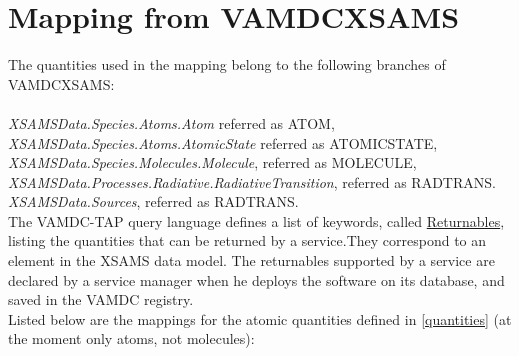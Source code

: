 \documentclass[11pt,a4paper]{ivoa}
\begin{document}
\section{Mapping from VAMDCXSAMS}

The quantities used in the mapping belong to the following branches of VAMDCXSAMS:\\
\\
\textit{XSAMSData.Species.Atoms.Atom}  referred as ATOM,\\
\textit{XSAMSData.Species.Atoms.AtomicState}  referred as ATOMICSTATE,\\
\textit{XSAMSData.Species.Molecules.Molecule}, referred as MOLECULE,\\
\textit{XSAMSData.Processes.Radiative.RadiativeTransition}, referred as RADTRANS.\\
\textit{XSAMSData.Sources}, referred as RADTRANS.\\


The VAMDC-TAP query language defines a list of keywords, called 
\href{https://standards.vamdc.eu/dictionary/returnables.html}{Returnables}, 
listing the quantities that 
can be returned by a service.They correspond to an element in the XSAMS data model. 
The returnables supported by a service are declared by a service manager when he 
deploys the software on its database, and saved in the VAMDC registry. \\

Listed below are the mappings for the atomic quantities defined in \ref{quantities} (at the 
moment only atoms, not molecules):
\end{document}
